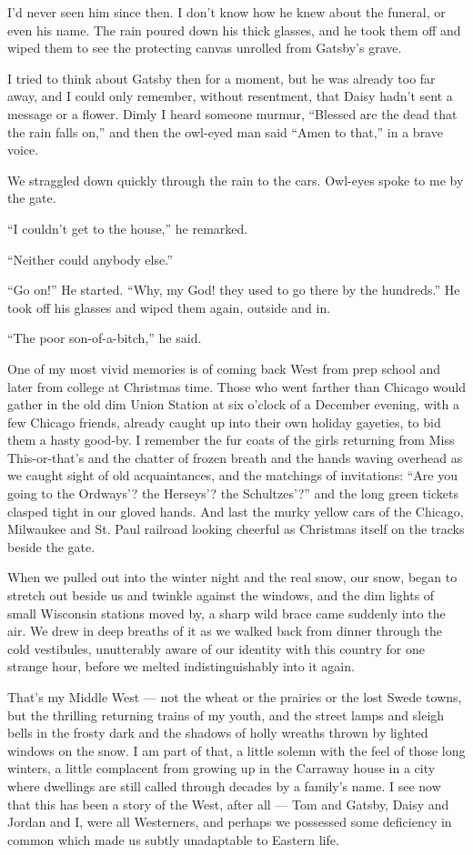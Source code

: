 \documentclass{znotebook}
\begin{document}
I'd never seen him since then. I don't know how he knew about the funeral, or even his name. The rain poured down his thick glasses, and he took them off and wiped them to see the protecting canvas unrolled from Gatsby's grave.

I tried to think about Gatsby then for a moment, but he was already too far away, and I could only remember, without resentment, that Daisy hadn't sent a message or a flower. Dimly I heard someone murmur, ``Blessed are the dead that the rain falls on,'' and then the owl-eyed man said ``Amen to that,'' in a brave voice.

We straggled down quickly through the rain to the cars. Owl-eyes spoke to me by the gate.

``I couldn't get to the house,'' he remarked.

``Neither could anybody else.''

``Go on!'' He started. ``Why, my God! they used to go there by the hundreds.'' He took off his glasses and wiped them again, outside and in.

``The poor son-of-a-bitch,'' he said.

One of my most vivid memories is of coming back West from prep school and later from college at Christmas time. Those who went farther than Chicago would gather in the old dim Union Station at six o'clock of a December evening, with a few Chicago friends, already caught up into their own holiday gayeties, to bid them a hasty good-by. I remember the fur coats of the girls returning from Miss This-or-that's and the chatter of frozen breath and the hands waving overhead as we caught sight of old acquaintances, and the matchings of invitations: ``Are you going to the Ordways'? the Herseys'? the Schultzes'?'' and the long green tickets clasped tight in our gloved hands. And last the murky yellow cars of the Chicago, Milwaukee and St. Paul railroad looking cheerful as Christmas itself on the tracks beside the gate.

When we pulled out into the winter night and the real snow, our snow, began to stretch out beside us and twinkle against the windows, and the dim lights of small Wisconsin stations moved by, a sharp wild brace came suddenly into the air. We drew in deep breaths of it as we walked back from dinner through the cold vestibules, unutterably aware of our identity with this country for one strange hour, before we melted indistinguishably into it again.

That's my Middle West — not the wheat or the prairies or the lost Swede towns, but the thrilling returning trains of my youth, and the street lamps and sleigh bells in the frosty dark and the shadows of holly wreaths thrown by lighted windows on the snow. I am part of that, a little solemn with the feel of those long winters, a little complacent from growing up in the Carraway house in a city where dwellings are still called through decades by a family's name. I see now that this has been a story of the West, after all — Tom and Gatsby, Daisy and Jordan and I, were all Westerners, and perhaps we possessed some deficiency in common which made us subtly unadaptable to Eastern life.
\end{document}
